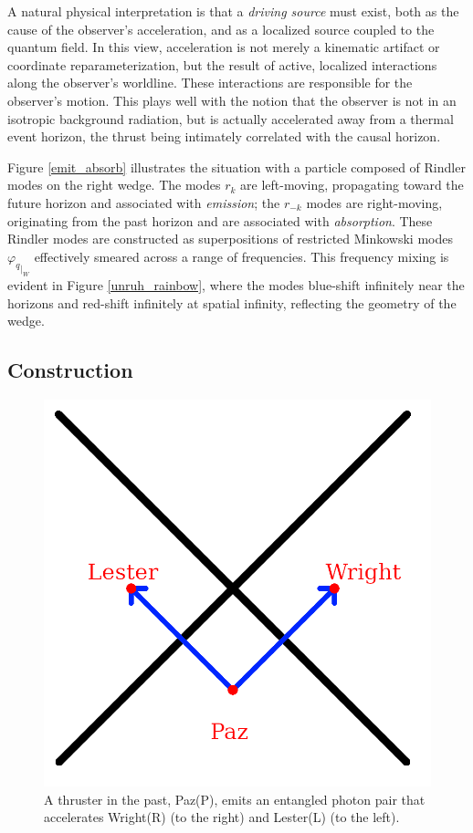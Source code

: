 \documentclass[12pt,a4paper]{article}
\begin{document}
A natural physical interpretation is that a {\it driving source} must exist, both as the cause of the observer’s acceleration, and as a localized source coupled to the quantum field. In this view, acceleration is not merely a kinematic artifact or coordinate reparameterization, but the result of active, localized interactions along the observer’s worldline. These interactions are responsible for the observer’s motion.  This plays well with the notion that the observer is not in an isotropic background radiation, but is actually accelerated away from a thermal event horizon, the thrust being intimately correlated with the causal horizon.


Figure \ref{emit_absorb} illustrates the situation with a particle composed of Rindler modes on the right wedge. The modes $r_k$ are left-moving, propagating toward the future horizon and associated with {\it emission}; the $r_{-k}$ modes are right-moving, originating from the past horizon and are associated with {\it absorption}. These Rindler modes are constructed as superpositions of restricted Minkowski modes ${\varphi_q}_{|_W}$ effectively smeared across a range of frequencies.  This frequency mixing is evident in Figure \ref{unruh_rainbow}, where the modes blue-shift infinitely near the horizons and red-shift infinitely at spatial infinity, reflecting the geometry of the wedge.

\subsection{Construction}

\begin{figure}[h]
\centering
\includegraphics[scale=0.75]{paz.png}
\captionsetup{width=0.7\textwidth}
\caption{A thruster in the past, Paz(P), emits an entangled photon pair that accelerates Wright(R) (to the right) and Lester(L) (to the left).}
\label{paz}
\end{figure}
\end{document}

